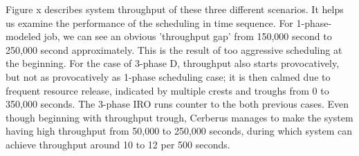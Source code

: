 Figure x describes system throughput of these three different scenarios.
It helps us examine the performance of the scheduling in time sequence.
For 1-phase-modeled job, we can see an obvious 'throughput gap'
from 150,000 second to 250,000 second approximately.
This is the result of too aggressive scheduling at the beginning.
For the case of 3-phase D, throughput also starts provocatively,
but not as provocatively as 1-phase scheduling case;
it is then calmed due to frequent resource release,
indicated by multiple crests and troughs from 0 to 350,000 seconds.
The 3-phase IRO runs counter to the both previous cases.
Even though beginning with throughput trough,
Cerberus manages to make the system having high throughput from 50,000 to 250,000 seconds,
during which system can achieve throughput around 10 to 12 per 500 seconds. 



